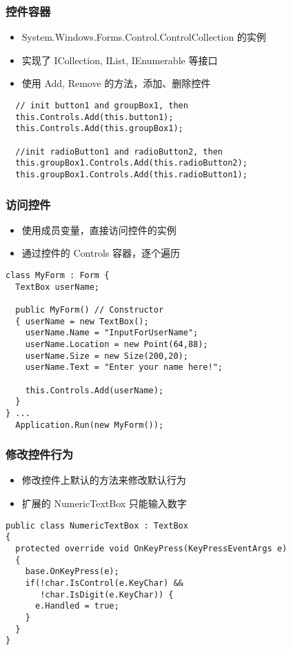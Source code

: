 \begin{frame}[fragile]
\frametitle{控件容器}
\begin{itemize}
\item System.Windows.Forms.Control.ControlCollection 的实例
\item 实现了 ICollection, IList, IEnumerable 等接口
\item 使用 Add, Remove 的方法，添加、删除控件
\end{itemize}
\begin{lstlisting}
  // init button1 and groupBox1, then 
  this.Controls.Add(this.button1);
  this.Controls.Add(this.groupBox1);

  //init radioButton1 and radioButton2, then
  this.groupBox1.Controls.Add(this.radioButton2);
  this.groupBox1.Controls.Add(this.radioButton1);
\end{lstlisting}
\end{frame}

\begin{frame}[fragile]
\frametitle{访问控件}
\begin{itemize}
\item 使用成员变量，直接访问控件的实例
\item 通过控件的 Controls 容器，逐个遍历
\end{itemize}
\begin{lstlisting}
class MyForm : Form {
  TextBox userName;
  
  public MyForm() // Constructor
  { userName = new TextBox();
    userName.Name = "InputForUserName";
    userName.Location = new Point(64,88);
    userName.Size = new Size(200,20);
    userName.Text = "Enter your name here!";

    this.Controls.Add(userName);
  }
} ...
  Application.Run(new MyForm());
\end{lstlisting}
\end{frame}

\begin{frame}[fragile]
\frametitle{修改控件行为}
\begin{itemize}
\item 修改控件上默认的方法来修改默认行为
\item 扩展的 NumericTextBox 只能输入数字
\end{itemize}
\begin{lstlisting}
public class NumericTextBox : TextBox
{
  protected override void OnKeyPress(KeyPressEventArgs e)
  {
    base.OnKeyPress(e);
    if(!char.IsControl(e.KeyChar) && 
       !char.IsDigit(e.KeyChar)) {
      e.Handled = true;
    }
  }
}
\end{lstlisting}
\end{frame}

